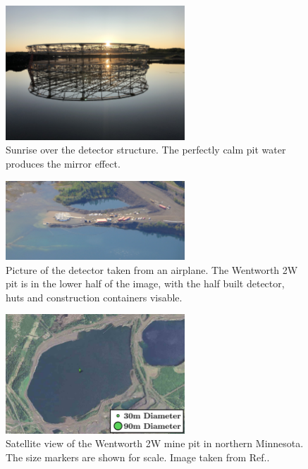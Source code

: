 \begin{figure} %
    \includegraphics[width=0.6\textwidth]{diagrams/5-chips/sunrise.jpeg}
    \caption[Sunrise over the \chips detector.]
    {Sunrise over the \chips detector structure. The perfectly calm pit water
        produces the mirror effect.}
    \label{fig:sunrise}
\end{figure}

\begin{figure} %
    \includegraphics[width=0.6\textwidth]{diagrams/5-chips/from_the_sky.jpg}
    \caption[Picture of the \chips detector from the air.]
    {Picture of the \chips detector taken from an airplane. The Wentworth 2W pit is in the lower
        half of the image, with the half built detector, huts and construction containers
        visable.}
    \label{fig:from_the_sky}
\end{figure}

\begin{figure} %
    \includegraphics[width=0.6\textwidth]{diagrams/5-chips/location.png}
    \caption[Satellite view of the Wentworth 2W mine pit.]
    {Satellite view of the Wentworth 2W mine pit in northern Minnesota.
        The size markers are shown for scale. Image taken from Ref.\cite{adamson2013}.}
    \label{fig:location}
\end{figure}

